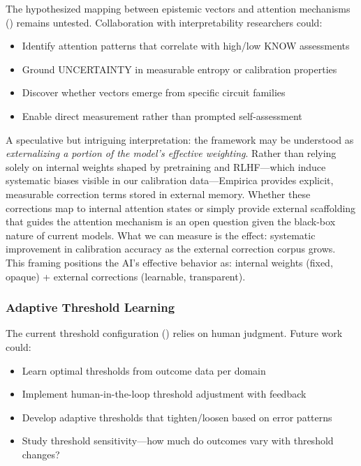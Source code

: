 The hypothesized mapping between epistemic vectors and attention mechanisms () remains untested. Collaboration with interpretability researchers could:

\begin{itemize}
    \item Identify attention patterns that correlate with high/low KNOW assessments
    \item Ground UNCERTAINTY in measurable entropy or calibration properties
    \item Discover whether vectors emerge from specific circuit families
    \item Enable direct measurement rather than prompted self-assessment
\end{itemize}

A speculative but intriguing interpretation: the framework may be understood as \emph{externalizing a portion of the model's effective weighting}. Rather than relying solely on internal weights shaped by pretraining and RLHF---which induce systematic biases visible in our calibration data---Empirica provides explicit, measurable correction terms stored in external memory. Whether these corrections map to internal attention states or simply provide external scaffolding that guides the attention mechanism is an open question given the black-box nature of current models. What we can measure is the effect: systematic improvement in calibration accuracy as the external correction corpus grows. This framing positions the AI's effective behavior as: internal weights (fixed, opaque) + external corrections (learnable, transparent).

\subsubsection{Adaptive Threshold Learning}

The current threshold configuration () relies on human judgment. Future work could:

\begin{itemize}
    \item Learn optimal thresholds from outcome data per domain
    \item Implement human-in-the-loop threshold adjustment with feedback
    \item Develop adaptive thresholds that tighten/loosen based on error patterns
    \item Study threshold sensitivity---how much do outcomes vary with threshold changes?
\end{itemize}

